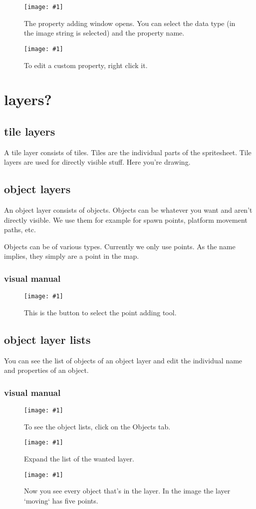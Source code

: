 \documentclass{article}
\newcommand{\erklaerbild}[2]{
	\begin{figure}[H]
		\center
		\texttt{[image: \#1]}
		\caption{#2}
	\end{figure}
}
\begin{document}
\erklaerbild
	{custom_prop_5_edit.png}
	{The property adding window opens. You can select the data type (in the image string is selected) and the property name.}

\erklaerbild
	{custom_prop_6_edit.png}
	{To edit a custom property, right click it.}

\section{layers?}
\subsection{tile layers}
A tile layer consists of tiles. Tiles are the individual parts of the spritesheet. Tile layers are used for directly visible stuff. Here you're drawing.

\subsection{object layers}
An object layer consists of objects. Objects can be whatever you want and aren't directly visible. We use them for example for spawn points, platform movement paths, etc.

Objects can be of various types. Currently we only use points. As the name implies, they simply are a point in the map.

\subsubsection{visual manual}
\erklaerbild
	{insert_point_edit.png}
	{This is the button to select the point adding tool.}

\subsection{object layer lists}
You can see the list of objects of an object layer and edit the individual name and properties of an object.

\subsubsection{visual manual}
\erklaerbild
	{object_list_1_edit.png}
	{To see the object lists, click on the Objects tab.}

\erklaerbild
	{object_list_2_edit.png}
	{Expand the list of the wanted layer.}

\erklaerbild
	{object_list_3.png}
	{Now you see every object that's in the layer. In the image the layer `moving` has five points.}
\end{document}
